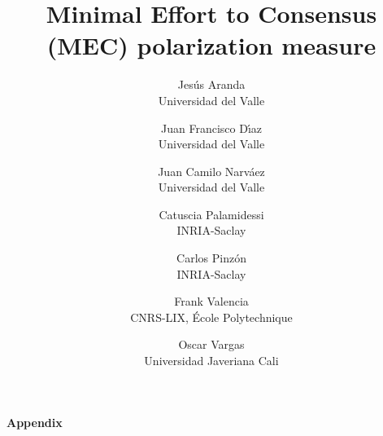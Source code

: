 \documentclass{article}
\title{Minimal Effort to Consensus (MEC) polarization measure}
\author{
  Jes\'{u}s Aranda\\Universidad del Valle
  \and
  Juan Francisco D\'{\i}az\\Universidad del Valle
  \and
  Juan Camilo Narv\'{a}ez\\Universidad del Valle
  \and
  Catuscia Palamidessi \\ INRIA-Saclay
  \and
  Carlos Pinz\'{o}n\\INRIA-Saclay
  \and
  Frank Valencia\\CNRS-LIX, \'Ecole Polytechnique
  \and
  Oscar Vargas\\Universidad Javeriana Cali
}
\theoremstyle{remark}
\begin{document}

\maketitle














\newpage

\appendix
\begin{center}
{\fontsize{24}{48}\selectfont \bfseries Appendix}
\end{center}
\vspace{2em}







\end{document}
